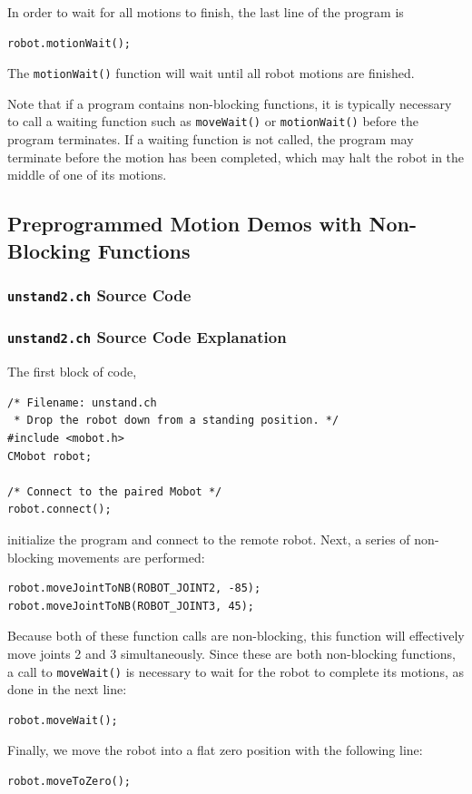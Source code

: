 \documentclass{article}
\begin{document}
In order to wait for all motions to finish, the last line of the program is
\begin{verbatim}
robot.motionWait();
\end{verbatim}
The \texttt{motionWait()} function will wait until all robot motions are finished.

Note that
if a program contains non-blocking functions, it is typically necessary to 
call a waiting function such as \texttt{moveWait()} or \texttt{motionWait()}
before the program terminates. If a waiting function is not called, the program
may terminate before the motion has been completed, which may halt the robot
in the middle of one of its motions.

\subsection{Preprogrammed Motion Demos with Non-Blocking Functions}
\subsubsection{\texttt{unstand2.ch} Source Code}

\subsubsection{\texttt{unstand2.ch} Source Code Explanation}
The first block of code,
\begin{verbatim}
/* Filename: unstand.ch 
 * Drop the robot down from a standing position. */
#include <mobot.h>
CMobot robot;

/* Connect to the paired Mobot */
robot.connect();
\end{verbatim}
initialize the program and connect to the remote robot. Next, a series of
non-blocking movements are performed:
\begin{verbatim}
robot.moveJointToNB(ROBOT_JOINT2, -85);
robot.moveJointToNB(ROBOT_JOINT3, 45);
\end{verbatim}
Because both of these function calls are non-blocking, this function will
effectively move joints 2 and 3 simultaneously. Since these are both
non-blocking functions, a call to \texttt{moveWait()} is necessary to
wait for the robot to complete its motions, as done in the next line:
\begin{verbatim}
robot.moveWait();
\end{verbatim}

Finally, we move the robot into a flat zero position with the following line:
\begin{verbatim}
robot.moveToZero();
\end{verbatim}
\end{document}
